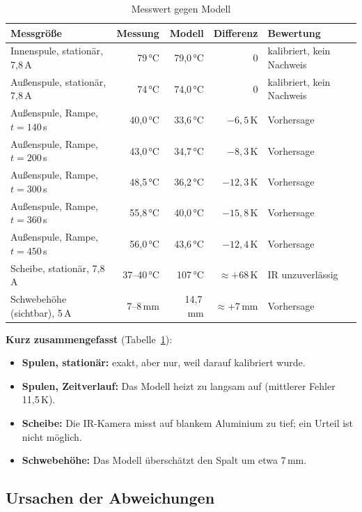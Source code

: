 \documentclass[a4paper, 10pt, conference]{ieeeconf}
\begin{document}
\begin{table}[t]
\caption{Messwert gegen Modell}
\label{tab:compare}
\centering\footnotesize
\begin{tabular}{@{}lrrrl@{}}
\toprule
Messgröße & Messung & Modell & Differenz & Bewertung \\
\midrule
Innenspule, stationär, 7,8\,A & 79\,°C & 79,0\,°C & 0 & kalibriert, kein Nachweis \\
Außenspule, stationär, 7,8\,A & 74\,°C & 74,0\,°C & 0 & kalibriert, kein Nachweis \\
Außenspule, Rampe, $t = 140$\,s & 40,0\,°C & 33,6\,°C & $-6{,}5$\,K & Vorhersage \\
Außenspule, Rampe, $t = 200$\,s & 43,0\,°C & 34,7\,°C & $-8{,}3$\,K & Vorhersage \\
Außenspule, Rampe, $t = 300$\,s & 48,5\,°C & 36,2\,°C & $-12{,}3$\,K & Vorhersage \\
Außenspule, Rampe, $t = 360$\,s & 55,8\,°C & 40,0\,°C & $-15{,}8$\,K & Vorhersage \\
Außenspule, Rampe, $t = 450$\,s & 56,0\,°C & 43,6\,°C & $-12{,}4$\,K & Vorhersage \\
Scheibe, stationär, 7,8\,A & 37--40\,°C & 107\,°C & $\approx +68$\,K & IR unzuverlässig \\
Schwebehöhe (sichtbar), 5\,A & 7--8\,mm & 14,7\,mm & $\approx +7$\,mm & Vorhersage \\
\bottomrule
\end{tabular}
\end{table}

\textbf{Kurz zusammengefasst} (Tabelle~\ref{tab:compare}):
\begin{itemize}[leftmargin=*]
  \item \textbf{Spulen, stationär:} exakt, aber nur, weil darauf kalibriert
        wurde.
  \item \textbf{Spulen, Zeitverlauf:} Das Modell heizt zu langsam auf
        (mittlerer Fehler 11,5\,K).
  \item \textbf{Scheibe:} Die IR-Kamera misst auf blankem Aluminium zu tief;
        ein Urteil ist nicht möglich.
  \item \textbf{Schwebehöhe:} Das Modell überschätzt den Spalt um etwa 7\,mm.
\end{itemize}

\subsection{Ursachen der Abweichungen}
\label{sec:causes}
\end{document}
